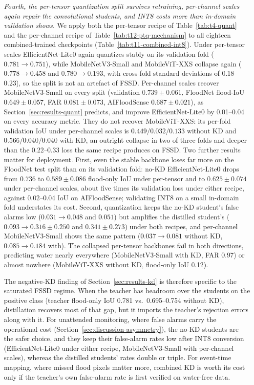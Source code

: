 \emph{Fourth, the per-tensor quantization split survives retraining, per-channel scales again repair the convolutional students, and INT8 costs more than in-domain validation shows.} We apply both the per-tensor recipe of Table~\ref{tab:t4-quant} and the per-channel recipe of Table~\ref{tab:t12-ptq-mechanism} to all eighteen combined-trained checkpoints (Table~\ref{tab:t11-combined-int8}). Under per-tensor scales EfficientNet-Lite0 again quantizes stably on its validation fold ($0.781 \rightarrow 0.751$), while MobileNetV3-Small and MobileViT-XXS collapse again ($0.778 \rightarrow 0.458$ and $0.780 \rightarrow 0.193$, with cross-fold standard deviations of 0.18--0.23), so the split is not an artefact of FSSD. Per-channel scales recover MobileNetV3-Small on every split (validation $0.739 \pm 0.061$, FloodNet flood-IoU $0.649 \pm 0.057$, FAR $0.081 \pm 0.073$, AIFloodSense $0.687 \pm 0.021$), as Section~\ref{sec:results-quant} predicts, and improve EfficientNet-Lite0 by 0.01--0.04 on every accuracy metric. They do not recover MobileViT-XXS: its per-fold validation IoU under per-channel scales is $0.449/0.032/0.133$ without KD and $0.566/0.040/0.040$ with KD, an outright collapse in two of three folds and deeper than the 0.22--0.33 loss the same recipe produces on FSSD. Two further results matter for deployment. First, even the stable backbone loses far more on the FloodNet test split than on its validation fold: no-KD EfficientNet-Lite0 drops from 0.736 to $0.589 \pm 0.086$ flood-only IoU under per-tensor and to $0.625 \pm 0.074$ under per-channel scales, about five times its validation loss under either recipe, against 0.02--0.04 IoU on AIFloodSense; validating INT8 on a small in-domain fold understates its cost. Second, quantization keeps the no-KD student's false alarms low ($0.031 \rightarrow 0.048$ and $0.051$) but amplifies the distilled student's ($0.093 \rightarrow 0.316 \pm 0.250$ and $0.341 \pm 0.273$) under both recipes, and per-channel MobileNetV3-Small shows the same pattern ($0.037 \rightarrow 0.081$ without KD, $0.085 \rightarrow 0.184$ with). The collapsed per-tensor backbones fail in both directions, predicting water nearly everywhere (MobileNetV3-Small with KD, FAR 0.97) or almost nowhere (MobileViT-XXS without KD, flood-only IoU 0.12).



The negative-KD finding of Section~\ref{sec:results-kd} is therefore specific to the saturated FSSD regime. When the teacher has headroom over the students on the positive class (teacher flood-only IoU 0.781 vs.\ 0.695--0.754 without KD), distillation recovers most of that gap, but it imports the teacher's rejection errors along with it. For unattended monitoring, where false alarms carry the operational cost (Section~\ref{sec:discussion-asymmetry}), the no-KD students are the safer choice, and they keep their false-alarm rates low after INT8 conversion (EfficientNet-Lite0 under either recipe, MobileNetV3-Small with per-channel scales), whereas the distilled students' rates double or triple. For event-time mapping, where missed flood pixels matter more, combined KD is worth its cost only if the teacher's own false-alarm rate is first verified on water-free data.
